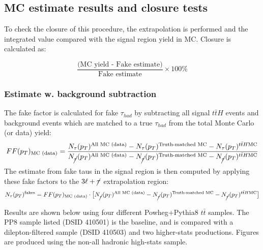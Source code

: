 \documentclass[11pt]{article}
\begin{document}
	\clearpage
	\subsection{MC estimate results and closure tests} 
	 To check the closure of this procedure, the extrapolation is performed and the integrated value compared with the signal region yield in MC. Closure is calculated as:

	\begin{equation}
		\frac{\text{(MC yield - Fake estimate)}}{\text{Fake estimate}}\times100\%
	\end{equation} 

	\subsubsection{Estimate w. background subtraction} 
	The fake factor is calculated for fake $\tau_{had}$ by subtracting all signal $t\bar{t}H$ events and background events which are matched to a true $\tau_{had}$ from the total Monte Carlo (or data) yield: 
	\begin{equation}
		FF(p_T)_{\text{MC (data)}} = \frac{N_\tau (p_T)^{\text{All MC (data)}} - N_\tau (p_T)^{\text{Truth-matched MC}} - N_\tau (p_T)^{t\bar{t}H \text{MC}} }{N_{\cancel{\tau}} (p_T)^{\text{All MC (data)}} - N_{\cancel{\tau}} (p_T)^{\text{Truth-matched MC}} - N_{\cancel{\tau}} (p_T)^{t\bar{t}H \text{MC}} }
	\end{equation}
	The estimate from fake taus in the signal region is then computed by applying these fake factors to the $3\ell+\cancel{\tau}$ extrapolation region: 
	\begin{equation}
		N_{\tau} (p_T)^{\text{fakes}} = FF(p_T)_{\text{MC (data)}}\cdot\big[N_{\cancel{\tau}} (p_T)^{\text{All MC (data)}} - N_{\cancel{\tau}} (p_T)^{\text{Truth-matched MC}} - N_{\cancel{\tau}} (p_T)^{t\bar{t}H \text{MC}} \big]
	\end{equation}

	Results are shown below using four different Powheg+Pythia8 $t\bar{t}$ samples. The PP8 sample listed (DSID 410501) is the baseline, and is compared with a dilepton-filtered sample (DSID 410503) and two higher-stats productions. Figures are produced using the non-all hadronic high-stats sample. 
\end{document}
